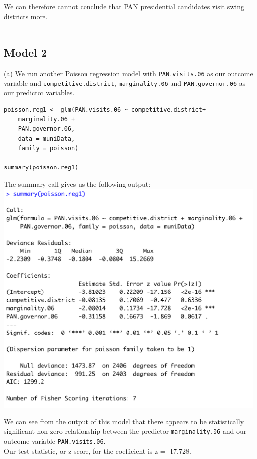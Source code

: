 \documentclass[12pt,letterpaper]{article}
\begin{document}
\noindent We can therefore cannot conclude that PAN presidential candidates visit swing districts more.
\\\\

\subsection{Model 2}

\noindent (a) We run another Poisson regression model with \texttt{PAN.visits.06} as our outcome variable and \texttt{competitive.district}, \texttt{marginality.06} and \texttt{PAN.governor.06} as our predictor variables. 

\begin{lstlisting}
poisson.reg1 <- glm(PAN.visits.06 ~ competitive.district+
	marginality.06 +
	PAN.governor.06,
	data = muniData,
	family = poisson)
	
summary(poisson.reg1)
\end{lstlisting}

\noindent The summary call gives us the following output:
\\

\includegraphics[width=\linewidth]{poisson.model.2}

\noindent We can see from the output of this model that there appears to be statistically significant non-zero relationship between the predictor \texttt{marginality.06} and our outcome variable \texttt{PAN.visits.06}.
\\
\noindent Our test statistic, or z-score, for the coefficient is z = -17.728.
\\
\end{document}
